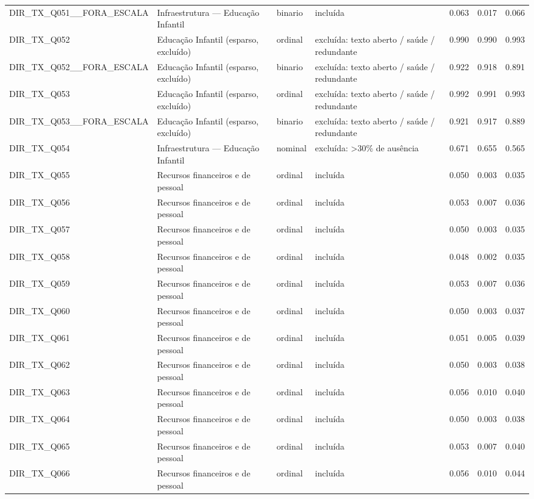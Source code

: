 \begin{tabular}{llllrrr}
DIR\_TX\_Q051\_\_FORA\_ESCALA & Infraestrutura — Educação Infantil & binario & incluída & 0.063 & 0.017 & 0.066 \\
DIR\_TX\_Q052 & Educação Infantil (esparso, excluído) & ordinal & excluída: texto aberto / saúde / redundante & 0.990 & 0.990 & 0.993 \\
DIR\_TX\_Q052\_\_FORA\_ESCALA & Educação Infantil (esparso, excluído) & binario & excluída: texto aberto / saúde / redundante & 0.922 & 0.918 & 0.891 \\
DIR\_TX\_Q053 & Educação Infantil (esparso, excluído) & ordinal & excluída: texto aberto / saúde / redundante & 0.992 & 0.991 & 0.993 \\
DIR\_TX\_Q053\_\_FORA\_ESCALA & Educação Infantil (esparso, excluído) & binario & excluída: texto aberto / saúde / redundante & 0.921 & 0.917 & 0.889 \\
DIR\_TX\_Q054 & Infraestrutura — Educação Infantil & nominal & excluída: >30\% de ausência & 0.671 & 0.655 & 0.565 \\
DIR\_TX\_Q055 & Recursos financeiros e de pessoal & ordinal & incluída & 0.050 & 0.003 & 0.035 \\
DIR\_TX\_Q056 & Recursos financeiros e de pessoal & ordinal & incluída & 0.053 & 0.007 & 0.036 \\
DIR\_TX\_Q057 & Recursos financeiros e de pessoal & ordinal & incluída & 0.050 & 0.003 & 0.035 \\
DIR\_TX\_Q058 & Recursos financeiros e de pessoal & ordinal & incluída & 0.048 & 0.002 & 0.035 \\
DIR\_TX\_Q059 & Recursos financeiros e de pessoal & ordinal & incluída & 0.053 & 0.007 & 0.036 \\
DIR\_TX\_Q060 & Recursos financeiros e de pessoal & ordinal & incluída & 0.050 & 0.003 & 0.037 \\
DIR\_TX\_Q061 & Recursos financeiros e de pessoal & ordinal & incluída & 0.051 & 0.005 & 0.039 \\
DIR\_TX\_Q062 & Recursos financeiros e de pessoal & ordinal & incluída & 0.050 & 0.003 & 0.038 \\
DIR\_TX\_Q063 & Recursos financeiros e de pessoal & ordinal & incluída & 0.056 & 0.010 & 0.040 \\
DIR\_TX\_Q064 & Recursos financeiros e de pessoal & ordinal & incluída & 0.050 & 0.003 & 0.038 \\
DIR\_TX\_Q065 & Recursos financeiros e de pessoal & ordinal & incluída & 0.053 & 0.007 & 0.040 \\
DIR\_TX\_Q066 & Recursos financeiros e de pessoal & ordinal & incluída & 0.056 & 0.010 & 0.044 \\

\end{tabular}
